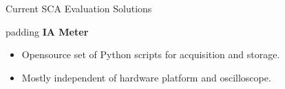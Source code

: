 \documentclass[xcolor=pdftex,dvipsnames,table,final]{beamer}
\begin{document}
\begin{frame}[fragile]{}
\begin{columns}[t]
\begin{column}{.31\linewidth}
\begin{block}{Current SCA Evaluation Solutions}
\begin{itemize}
\begin{itemize}
            \end{itemize}
        \end{itemize}
        \begin{center}
        \begin{minipage}[t]{0.9\linewidth}  
        \begin{beamercolorbox}[rounded=true]{padding}
          \textbf{IA Meter}
          {\small
          \begin{itemize}
            \item Opensource set of Python scripts for acquisition and storage.
            \item Mostly independent of hardware platform and oscilloscope.
          \end{itemize}
          }
        \end{beamercolorbox}
        \end{minipage}
        \end{center}


\end{block}
\end{column}
\end{columns}
\end{frame}
\end{document}
